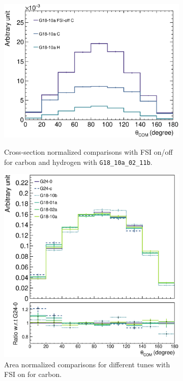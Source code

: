 \begin{figure}[ht!]
    \centering
    \begin{subfigure}[ht!]{\dbfigwid\textwidth}
        \centering
        \includegraphics[width=\dbfigwid\textwidth]{figures/COM/xnorm-CH_da_tan.eps} \\
        \caption{Cross-section normalized comparisons with FSI on/off for carbon and hydrogen with \texttt{G18\_10a\_02\_11b}.}
        \label{subfig:fsi-comp-chof}
    \end{subfigure}
    \begin{subfigure}[ht!]{\dbfigwid\textwidth}
        \centering
        \includegraphics[width=\dbfigwid\textwidth]{figures/COM/anorm-mod-ratio-_da_tan.eps}
        \caption{Area normalized comparisons for different tunes with FSI on for carbon. }
        \label{subfig:fsi-comp-gt}
    \end{subfigure}
    \caption{ }
    \label{fig:fsi-comp}
\end{figure}

